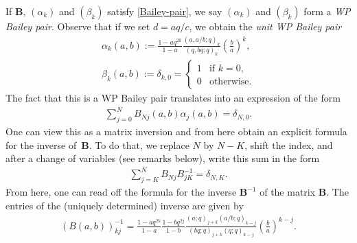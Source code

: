 \documentclass[pdftex]{sigma}
\numberwithin{equation}{section}
\newcommand{\B}{{ \mathbf B}}
\newcommand{\qrfac}[2]{{\left({#1}; q\right)_{#2}}} %
\begin{document}
If $\B$, $(\alpha_k)$ and $(\beta_k)$ satisfy \eqref{Bailey-pair}, we say $(\alpha_k)$ and $(\beta_k)$ form a {\em WP Bailey pair}. Observe that if we set $d=aq/c$, we obtain the {\em unit WP Bailey pair}
\begin{gather*}
\alpha_k(a,b) :=
 \frac{1-aq^{2k}}{1-a}
\frac{\qrfac{a, a/b}{k} }{\qrfac{q, bq}{k}}
\left( \frac{b}{a}\right)^{k} ,\\
\beta_k(a,b) := \delta_{k, 0} =
\begin{cases}
1 & \text{if } k=0 , \\
0 & \text{otherwise.}
\end{cases}
\end{gather*}
The fact that this is a WP Bailey pair translates into an expression of the form
 \begin{gather}\label{Bailey-inversion-1}
\sum_{j=0}^N B_{Nj}(a,b) \alpha_j(a,b) = \delta_{N, 0}.
\end{gather}
One can view this as a matrix inversion and from here obtain an explicit formula for the inverse of~$\B$. To do that, we replace $N$ by $N-K$, shift the index, and after a change of variables (see remarks below), write this sum in the form
\begin{gather*}
\sum\limits_{j=K}^N B_{Nj} B^{-1}_{jK} =\delta_{N, K}.
\end{gather*}
From here, one can read off the formula for the inverse $\B^{-1}$ of the matrix $\B$. The entries of the (uniquely determined) inverse are given by
\begin{gather}
(B(a,b))^{-1}_{k j} =\frac{1-aq^{2k}}{1-a}\frac{1-bq^{2j}}{1-b}\frac{\qrfac{a}{j+k} \qrfac{a/b}{k-j}}
{ \qrfac{bq}{j+k}\qrfac{q}{k-j}}\left( \frac{b}{a}\right)^{k-j}.\label{Bressoud-inverse}
\end{gather}
\end{document}
